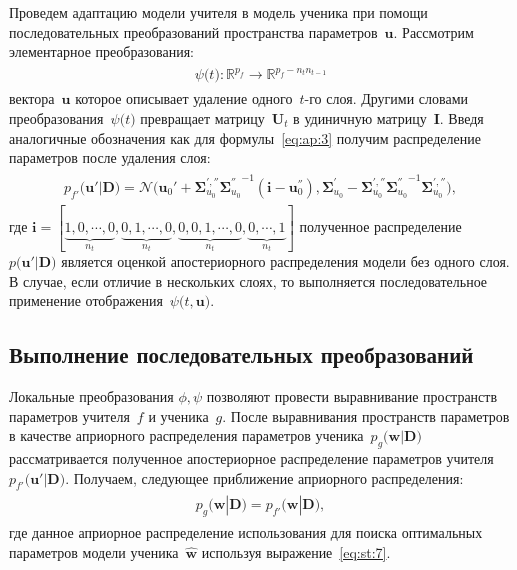 \documentclass[12pt]{a&t}
\begin{document}
Проведем адаптацию модели учителя в модель ученика при помощи последовательных преобразований пространства параметров~$\mathbf{u}$. Рассмотрим элементарное преобразования:
\begin{gather}
\label{eq:ap:4}
\begin{aligned}
\psi\bigr(t\bigr) : \mathbb{R}^{p_f} \to \mathbb{R}^{p_f-n_tn_{t-1}}
\end{aligned}
\end{gather}
вектора~$\mathbf{u}$ которое описывает удаление одного~$t$-го слоя. Другими словами преобразования~$\psi\bigr(t\bigr)$ превращает матрицу~$\mathbf{U}_t$ в удиничную матрицу~$\mathbf{I}$. Введя аналогичные обозначения как для формулы~\eqref{eq:ap:3} получим распределение параметров после удаления слоя:
\begin{gather}
\label{eq:ap:5}
\begin{aligned}
p_{f'}\bigr(\mathbf{u}'|\mathbf{D}\bigr) = \mathcal{N}\bigr(\mathbf{u}_{0}'+\bm{\Sigma}_{u_0}^{', ''}{\bm{\Sigma}_{u_0}^{''}}^{-1}\left(\mathbf{i} - \mathbf{u}_0^{''}\right), \bm{\Sigma}_{u_0}^{'}-\bm{\Sigma}_{u_0}^{', ''}{\bm{\Sigma}_{u_0}^{''}}^{-1}\bm{\Sigma}_{u_0}^{', ''}\bigr),
\end{aligned}
\end{gather}
где $\mathbf{i}=[\underbrace{1, 0, \cdots, 0}_{n_t}, \underbrace{0, 1, \cdots, 0}_{n_t}, \underbrace{0, 0, 1, \cdots, 0}_{n_t}, \underbrace{0, \cdots, 1}_{n_t}]$ полученное распределение $p\bigr(\mathbf{u}'|\mathbf{D}\bigr)$ является оценкой апостериорного распределения модели без одного слоя. В случае, если отличие в нескольких слоях, то выполняется последовательное применение отображения~$\psi\bigr(t, \mathbf{u}\bigr)$.

\subsection{Выполнение последовательных преобразований}
Локальные преобразования $\phi, \psi$ позволяют провести выравнивание пространств параметров учителя~$f$ и ученика~$g$. После выравнивания пространств параметров в качестве априорного распределения параметров ученика~$p_g\bigr(\mathbf{w}|\mathbf{D}\bigr)$ рассматривается полученное апостериорное распределение параметров учителя~$p_{f'}\bigr(\mathbf{u}'|\mathbf{D}\bigr)$. Получаем, следующее приближение априорного распределения:
\begin{gather}
\label{eq:ap:6}
\begin{aligned}
p_g\bigr(\mathbf{w}|\mathbf{D}\bigr) = p_{f'}\bigr(\mathbf{w}|\mathbf{D}\bigr),
\end{aligned}
\end{gather}
где данное априорное распределение использования для поиска оптимальных параметров модели ученика~$\hat{\mathbf{w}}$ используя выражение~\eqref{eq:st:7}.
\end{document}
